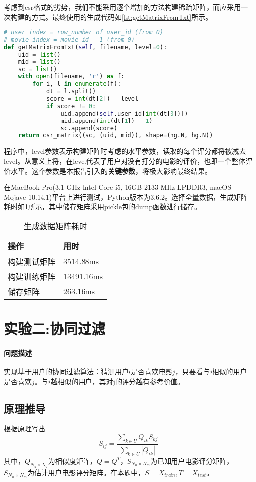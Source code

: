 \documentclass[a4paper,12pt]{article}
\begin{document}
    考虑到csr格式的劣势，我们不能采用逐个增加的方法构建稀疏矩阵，而应采用一次构建的方式。最终使用的生成代码如\cref{lst:getMatrixFromTxt}所示。
    \begin{lstlisting}[language=python,caption={getMatrixFromTxt},label=lst:getMatrixFromTxt]
# user index = row_number of user_id (from 0)
# movie index = movie_id - 1 (from 0)
def getMatrixFromTxt(self, filename, level=0):
    uid = list()
    mid = list()
    sc = list()
    with open(filename, 'r') as f:
        for i, l in enumerate(f):
            dt = l.split()
            score = int(dt[2]) - level
            if score != 0:
                uid.append(self.user_id[int(dt[0])])
                mid.append(int(dt[1]) - 1)
                sc.append(score)
    return csr_matrix((sc, (uid, mid)), shape=(hg.N, hg.N))
    \end{lstlisting}

    程序中，level参数表示构建矩阵时考虑的水平参数，读取的每个评分都将被减去level。从意义上将，在level代表了用户对没有打分的电影的评价，也即一个整体评价水平。这个参数是本报告引入的\textbf{关键参数}，将极大影响最终结果。

    在MacBook Pro(3.1 GHz Intel Core i5, 16GB 2133 MHz LPDDR3, macOS Mojave 10.14.1)平台上进行测试，Python版本为3.6.2。选择全量数据，生成矩阵耗时如\cref{tbl:exp1}所示，其中储存矩阵采用pickle包的dump函数进行储存。
    \begin{table}
      \centering
      \caption{生成数据矩阵耗时}
      \label{tbl:exp1}
      \begin{tabular}{ll}
        \toprule
        操作&用时\\
        \midrule
        构建测试矩阵&3514.88ms\\
        构建训练矩阵&13491.16ms\\
        储存矩阵&263.16ms\\
        \bottomrule
      \end{tabular}
    \end{table}
    \section{实验二:协同过滤}
    \paragraph{问题描述}
    实现基于用户的协同过滤算法：猜测用户$i$是否喜欢电影$j$，只要看与$i$相似的用户是否喜欢$j$。与$i$越相似的用户，其对j的评分越有参考价值。
    \subsection{原理推导}
    \label{exp2eq}
    根据原理写出
    \begin{equation}
      \bar S_{ij} = \frac{\sum\limits_{k\in U} Q_{ik}S_{kj}}{\sum\limits_{k\in U} |Q_{ik}|}
    \end{equation}
    其中，$Q_{N_u\times N_u}$为相似度矩阵，$Q=Q^T$，$S_{N_u\times N_m}$为已知用户电影评分矩阵，$\bar S_{N_u\times N_m}$为估计用户电影评分矩阵。在本题中，$S=X_{train}, T=X_{test}$。
\end{document}
